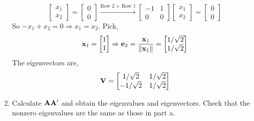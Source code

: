 \begin{enumerate}[label=(\alph*)]
\[\begin{bmatrix}
                    x_1 \\
                    x_2
                \end{bmatrix}
                =
                \begin{bmatrix}
                    0 \\
                    0
                \end{bmatrix}
                \overset{\text{Row 2 + Row 1}}{\longrightarrow}
                \begin{bmatrix}
                    -1 & 1 \\
                    0 & 0
                \end{bmatrix}
                \begin{bmatrix}
                    x_1 \\
                    x_2
                \end{bmatrix}
                =
                \begin{bmatrix}
                    0 \\
                    0
                \end{bmatrix}
            \]
            So $-x_1 + x_2 = 0 \Rightarrow x_1 = x_2$. Pick,
            \[
                \bold{x}_1
                =
                \begin{bmatrix}
                    1 \\
                    1
                \end{bmatrix}
                \Rightarrow
                \bold{e}_2
                =
                \frac{\bold{x}_1}{\left\|\bold{x}_1\right\|}
                =
                \begin{bmatrix}
                    1/\sqrt{2} \\
                    1/\sqrt{2}
                \end{bmatrix}
            \]
            The eigenvectors are,
            \[
                \bold{V}
                =
                \begin{bmatrix}
                    1/\sqrt{2} & 1/\sqrt{2} \\
                    -1/\sqrt{2} & 1/\sqrt{2}
                \end{bmatrix}
            \]
            \item Calculate $\bold{A}\bold{A}^\prime$ and obtain the eigenvalues and eigenvectors. Check that the nonzero eigenvalues are the same as those in part a.
            \par

\end{enumerate}
